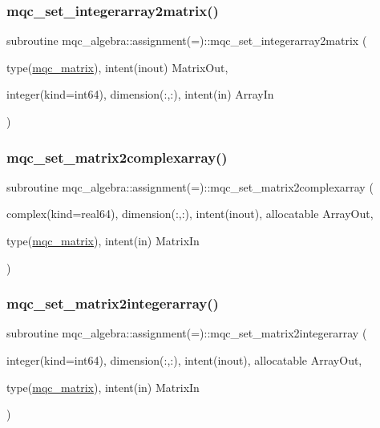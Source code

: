 \subsubsection{\texorpdfstring{mqc\_set\_integerarray2matrix()}{mqc\_set\_integerarray2matrix()}}
{\footnotesize\ttfamily subroutine mqc\+\_\+algebra\+::assignment(=)\+::mqc\+\_\+set\+\_\+integerarray2matrix (\begin{DoxyParamCaption}\item[{type(\mbox{\hyperlink{structmqc__algebra_1_1mqc__matrix}{mqc\+\_\+matrix}}), intent(inout)}]{Matrix\+Out,  }\item[{integer(kind=int64), dimension(\+:,\+:), intent(in)}]{Array\+In }\end{DoxyParamCaption})}

\mbox{\label{interfacemqc__algebra_1_1assignment_07_0A_08_a26dd52ed9adc201828577f8b70987466}} 
\subsubsection{\texorpdfstring{mqc\_set\_matrix2complexarray()}{mqc\_set\_matrix2complexarray()}}
{\footnotesize\ttfamily subroutine mqc\+\_\+algebra\+::assignment(=)\+::mqc\+\_\+set\+\_\+matrix2complexarray (\begin{DoxyParamCaption}\item[{complex(kind=real64), dimension(\+:,\+:), intent(inout), allocatable}]{Array\+Out,  }\item[{type(\mbox{\hyperlink{structmqc__algebra_1_1mqc__matrix}{mqc\+\_\+matrix}}), intent(in)}]{Matrix\+In }\end{DoxyParamCaption})}

\mbox{\label{interfacemqc__algebra_1_1assignment_07_0A_08_a94e97f9845076db107ea3ad97f59d43a}} 
\subsubsection{\texorpdfstring{mqc\_set\_matrix2integerarray()}{mqc\_set\_matrix2integerarray()}}
{\footnotesize\ttfamily subroutine mqc\+\_\+algebra\+::assignment(=)\+::mqc\+\_\+set\+\_\+matrix2integerarray (\begin{DoxyParamCaption}\item[{integer(kind=int64), dimension(\+:,\+:), intent(inout), allocatable}]{Array\+Out,  }\item[{type(\mbox{\hyperlink{structmqc__algebra_1_1mqc__matrix}{mqc\+\_\+matrix}}), intent(in)}]{Matrix\+In }\end{DoxyParamCaption})}


